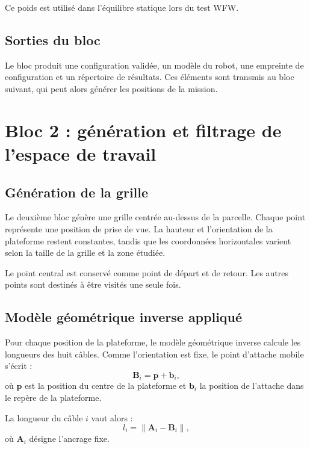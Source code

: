 Ce poids est utilisé dans l'équilibre statique lors du test WFW.

\subsection{Sorties du bloc}

Le bloc produit une configuration validée, un modèle du robot, une empreinte de configuration et un répertoire de résultats. Ces éléments sont transmis au bloc suivant, qui peut alors générer les positions de la mission.

\section{Bloc 2 : génération et filtrage de l'espace de travail}
\label{sec:bloc_wfw}

\subsection{Génération de la grille}

Le deuxième bloc génère une grille centrée au-dessus de la parcelle. Chaque point représente une position de prise de vue. La hauteur et l'orientation de la plateforme restent constantes, tandis que les coordonnées horizontales varient selon la taille de la grille et la zone étudiée.

Le point central est conservé comme point de départ et de retour. Les autres points sont destinés à être visités une seule fois.

\subsection{Modèle géométrique inverse appliqué}

Pour chaque position de la plateforme, le modèle géométrique inverse calcule les longueurs des huit câbles. Comme l'orientation est fixe, le point d'attache mobile s'écrit :
\begin{equation}
\mathbf{B}_i = \mathbf{p}+\mathbf{b}_i,
\label{eq:attache_tandem}
\end{equation}
où $\mathbf{p}$ est la position du centre de la plateforme et $\mathbf{b}_i$ la position de l'attache dans le repère de la plateforme.

La longueur du câble $i$ vaut alors :
\begin{equation}
l_i = \left\|\mathbf{A}_i-\mathbf{B}_i\right\|,
\label{eq:mgi_tandem}
\end{equation}
où $\mathbf{A}_i$ désigne l'ancrage fixe.

